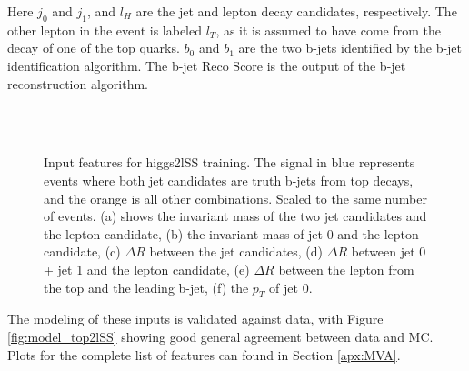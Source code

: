 Here $j_0$ and $j_1$, and $l_H$ are the jet and lepton decay candidates, respectively. The other lepton in the event is labeled $l_T$, as it is assumed to have come from the decay of one of the top quarks. $b_0$ and $b_1$ are the two b-jets identified by the b-jet identification algorithm. The b-jet Reco Score is the output of the b-jet reconstruction algorithm.

\begin{figure}[H]
    \centering
    \\
    \\
    \caption{Input features for higgs2lSS training. The signal in blue represents events where both jet candidates are truth b-jets from top decays, and the orange is all other combinations. Scaled to the same number of events. (a) shows the invariant mass of the two jet candidates and the lepton candidate, (b) the invariant mass of jet 0 and the lepton candidate, (c) $\Delta R$ between the jet candidates, (d) $\Delta R$ between jet 0 + jet 1 and the lepton candidate, (e) $\Delta R$ between the lepton from the top and the leading b-jet, (f) the $p_T$ of jet 0.}
    \label{fig:features_higgs2lSS}
\end{figure}

The modeling of these inputs is validated against data, with Figure \ref{fig:model_top2lSS} showing good general agreement between data and MC. Plots for the complete list of features can found in Section \ref{apx:MVA}.


